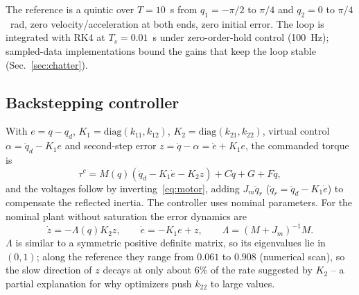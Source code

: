 \documentclass[10pt,journal,compsoc]{IEEEtran}
\begin{document}
The reference is a quintic over $T=10$~s from $q_1=-\pi/2$ to $\pi/4$ and $q_2=0$ to $\pi/4$~rad, zero velocity/acceleration at both ends, zero initial error. The loop is integrated with RK4 at $T_s=0.01$~s under zero-order-hold control (100~Hz); sampled-data implementations bound the gains that keep the loop stable \cite{franklin1998} (Sec.~\ref{sec:chatter}).

\subsection{Backstepping controller}\label{sec:control}
With $e=q-q_d$, $K_1=\mathrm{diag}(k_{11},k_{12})$, $K_2=\mathrm{diag}(k_{21},k_{22})$, virtual control $\alpha=\dot q_d-K_1e$ and second-step error $z=\dot q-\alpha=\dot e+K_1e$, the commanded torque is
\begin{equation}
\tau^c=M(q)(\ddot q_d-K_1\dot e-K_2z)+C\dot q+G+F\dot q,
\label{eq:bs_tau}
\end{equation}
and the voltages follow by inverting~\eqref{eq:motor}, adding $J_m\ddot q_r$ ($\ddot q_r=\ddot q_d-K_1\dot e$) to compensate the reflected inertia. The controller uses nominal parameters. For the nominal plant without saturation the error dynamics are
\begin{equation}
\dot z=-\Lambda(q)K_2z,\qquad \dot e=-K_1e+z,\qquad \Lambda=(M+J_m)^{-1}M.
\label{eq:errdyn}
\end{equation}
$\Lambda$ is similar to a symmetric positive definite matrix, so its eigenvalues lie in $(0,1)$; along the reference they range from $0.061$ to $0.908$ (numerical scan), so the slow direction of $z$ decays at only about 6\% of the rate suggested by $K_2$ -- a partial explanation for why optimizers push $k_{22}$ to large values.
\end{document}
